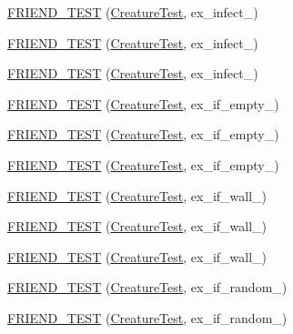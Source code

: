\begin{DoxyCompactItemize}
\item 
\hyperlink{classCreature_a86bc8c06b2d610d2492e8c48bb83cd2d}{F\-R\-I\-E\-N\-D\-\_\-\-T\-E\-S\-T} (\hyperlink{classCreature_a8c0a0bc2c49a9483eb70dbe9f74d0b9a}{Creature\-Test}, ex\-\_\-infect\-\_)
\item 
\hyperlink{classCreature_a7b812fe2acc5d409bb7e3c80eb413912}{F\-R\-I\-E\-N\-D\-\_\-\-T\-E\-S\-T} (\hyperlink{classCreature_a8c0a0bc2c49a9483eb70dbe9f74d0b9a}{Creature\-Test}, ex\-\_\-infect\-\_)
\item 
\hyperlink{classCreature_acb4b51c299319178a7258aa0850b7eef}{F\-R\-I\-E\-N\-D\-\_\-\-T\-E\-S\-T} (\hyperlink{classCreature_a8c0a0bc2c49a9483eb70dbe9f74d0b9a}{Creature\-Test}, ex\-\_\-infect\-\_)
\item 
\hyperlink{classCreature_a64c98a8ad349434b0a51cd0ccf73f2d0}{F\-R\-I\-E\-N\-D\-\_\-\-T\-E\-S\-T} (\hyperlink{classCreature_a8c0a0bc2c49a9483eb70dbe9f74d0b9a}{Creature\-Test}, ex\-\_\-if\-\_\-empty\-\_)
\item 
\hyperlink{classCreature_ae45f626beca465336bb70e810ec73de9}{F\-R\-I\-E\-N\-D\-\_\-\-T\-E\-S\-T} (\hyperlink{classCreature_a8c0a0bc2c49a9483eb70dbe9f74d0b9a}{Creature\-Test}, ex\-\_\-if\-\_\-empty\-\_)
\item 
\hyperlink{classCreature_aa65314b3d633c28dcd8b96c3a89da933}{F\-R\-I\-E\-N\-D\-\_\-\-T\-E\-S\-T} (\hyperlink{classCreature_a8c0a0bc2c49a9483eb70dbe9f74d0b9a}{Creature\-Test}, ex\-\_\-if\-\_\-empty\-\_)
\item 
\hyperlink{classCreature_a0979bfbbb428306a8b3eb92f1b4e03b6}{F\-R\-I\-E\-N\-D\-\_\-\-T\-E\-S\-T} (\hyperlink{classCreature_a8c0a0bc2c49a9483eb70dbe9f74d0b9a}{Creature\-Test}, ex\-\_\-if\-\_\-wall\-\_)
\item 
\hyperlink{classCreature_ac0b642db391d9877b3588216896e0240}{F\-R\-I\-E\-N\-D\-\_\-\-T\-E\-S\-T} (\hyperlink{classCreature_a8c0a0bc2c49a9483eb70dbe9f74d0b9a}{Creature\-Test}, ex\-\_\-if\-\_\-wall\-\_)
\item 
\hyperlink{classCreature_a6eb188d6fad8bd75568c2ade64c19db5}{F\-R\-I\-E\-N\-D\-\_\-\-T\-E\-S\-T} (\hyperlink{classCreature_a8c0a0bc2c49a9483eb70dbe9f74d0b9a}{Creature\-Test}, ex\-\_\-if\-\_\-wall\-\_)
\item 
\hyperlink{classCreature_a94d24e57f54754c7f11343b9f2913d4b}{F\-R\-I\-E\-N\-D\-\_\-\-T\-E\-S\-T} (\hyperlink{classCreature_a8c0a0bc2c49a9483eb70dbe9f74d0b9a}{Creature\-Test}, ex\-\_\-if\-\_\-random\-\_)
\item 
\hyperlink{classCreature_aec5c4493d8b13ce3aae23d973ec8b5e0}{F\-R\-I\-E\-N\-D\-\_\-\-T\-E\-S\-T} (\hyperlink{classCreature_a8c0a0bc2c49a9483eb70dbe9f74d0b9a}{Creature\-Test}, ex\-\_\-if\-\_\-random\-\_)

\end{DoxyCompactItemize}
